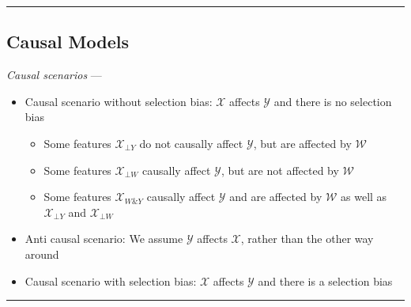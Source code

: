 {\color{black}\hrule height 0.001mm}

\subsection*{Causal Models}

\emph{Causal scenarios} --- 
\begin{itemize}
    \item Causal scenario without selection bias: $\mathcal{X}$ affects $\mathcal{Y}$ and there is no selection bias 
    \begin{itemize}
        \item Some features $\mathcal{X}_{\bot Y}$ do not causally affect $\mathcal{Y}$, but are affected by $\mathcal{W}$
        \item Some features $\mathcal{X}_{\bot W}$ causally affect $\mathcal{Y}$, but are not affected by $\mathcal{W}$
        \item Some features $\mathcal{X}_{W \& Y}$ causally affect $\mathcal{Y}$ and are affected by $\mathcal{W}$ as well as $\mathcal{X}_{\bot Y}$ and $\mathcal{X}_{\bot W}$
    \end{itemize}
    \item Anti causal scenario: We assume $\mathcal{Y}$ affects $\mathcal{X}$, rather than the other way around
    \item Causal scenario with selection bias: $\mathcal{X}$ affects $\mathcal{Y}$ and there is a selection bias 
\end{itemize}

{\color{lightgray}\hrule height 0.001mm}


